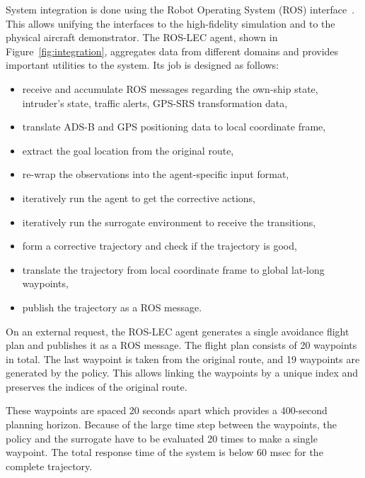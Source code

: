 System integration is done using the Robot Operating System (ROS) interface~\cite{quigley2009ros}. This allows unifying the interfaces to the high-fidelity simulation and to the physical aircraft demonstrator.
The ROS-LEC agent, shown in Figure~\ref{fig:integration}, aggregates data from different domains and provides important utilities to the system. Its job is designed as follows: 
\begin{itemize}
	\item receive and accumulate ROS messages regarding the own-ship state,
	intruder's state, traffic alerts, GPS-SRS transformation data,
	\item translate ADS-B and GPS positioning data to local coordinate frame,
	\item extract the goal location from the original route,
	\item re-wrap the observations into the agent-specific input format,
	\item iteratively run the agent to get the corrective actions,
	\item iteratively run the surrogate environment to receive the transitions,
	\item form a corrective trajectory and check if the trajectory is good,
	\item translate the trajectory from local coordinate frame to global lat-long waypoints,
	\item publish the trajectory as a ROS message.
\end{itemize}

On an external request, the ROS-LEC agent generates a single avoidance flight plan and publishes it as a ROS message. The flight plan consists of 20 waypoints in total. The last waypoint is taken from the original route, and 19 waypoints are generated by the policy. This allows linking the waypoints by a unique index and preserves the indices of the original route.

These waypoints are spaced 20 seconds apart which provides a 400-second planning horizon. 
Because of the large time step between the waypoints, the policy and the surrogate have to be evaluated 20 times to make a single waypoint. The total response time of the system is below 60 msec for the complete trajectory.

